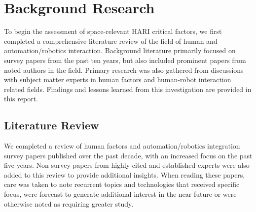 
\section{Background Research}
To begin the assessment of space-relevant HARI critical factors, we first completed a comprehensive literature review of the field of human and automation/robotics interaction. Background literature primarily focused on survey papers from the past ten years, but also included prominent papers from noted authors in the field. Primary research was also gathered from discussions with subject matter experts in human factors and human-robot interaction related fields. Findings and lessons learned from this investigation are provided in this report.

\subsection{Literature Review}
We completed a review of human factors and automation/robotics integration survey papers published over the past decade, with an increased focus on the past five years. Non-survey papers from highly cited and established experts were also added to this review to provide additional insights. When reading these papers, care was taken to note recurrent topics and technologies that received specific focus, were forecast to generate additional interest in the near future or were otherwise noted as requiring greater study.

